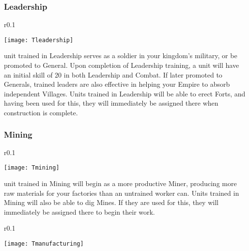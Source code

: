\subsubsection{\textsf{Leadership}}


\begin{wrapfigure}{r}{0.1\textwidth}
    \vspace{-20pt}
    \begin{center}
        \texttt{[image: Tleadership]}
    \end{center}
    \vspace{-20pt}
\end{wrapfigure}

 unit trained in Leadership serves as a soldier in your kingdom’s military, or be promoted to General. Upon completion of Leadership training, a unit will have an initial skill of 20 in both Leadership and Combat. If later promoted to Generals, trained leaders are also effective in helping your Empire to absorb independent Villages. Units trained in Leadership will be able to erect Forts, and having been used for this, they will immediately be assigned there when construction is complete.

\subsubsection{\textsf{Mining}}


\begin{wrapfigure}{r}{0.1\textwidth}
    \vspace{-20pt}
    \begin{center}
        \texttt{[image: Tmining]}
    \end{center}
    \vspace{-20pt}
\end{wrapfigure}

 unit trained in Mining will begin as a more productive Miner, producing more raw materials for your factories than an untrained worker can. Units trained in Mining will also be able to dig Mines. If they are used for this, they will immediately be assigned there to begin their work.

\begin{wrapfigure}{r}{0.1\textwidth}
        \begin{center}
        \texttt{[image: Tmanufacturing]}
    \end{center}
    \vspace{-20pt}
\end{wrapfigure}

